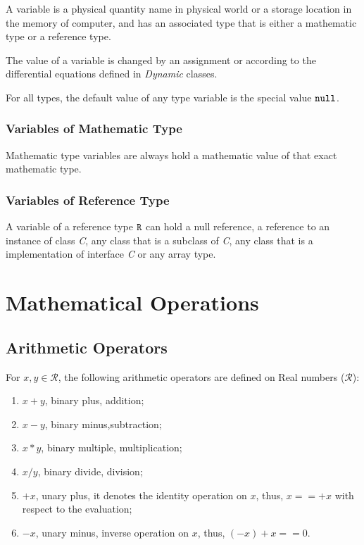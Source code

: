 \documentclass{WileySix}
\begin{document}
A variable is a physical quantity name in physical world or a storage location in the memory of computer, and has an associated type that is either a mathematic type or a reference type.

The value of a variable  is changed by an assignment or according to the differential equations defined in {\em Dynamic} classes.

For all types, the default value of any type variable is the special value ${\tt null}$.

\subsubsection{Variables of Mathematic Type}
Mathematic type variables are always hold a mathematic value of that exact mathematic type.


\subsubsection{Variables of Reference Type}
A variable of a reference type ${\tt R}$ can hold a null reference, a reference to an instance of class {\em C}, any class that is a subclass of {\em C}, any class that is a implementation of interface {\em C} or any array type.



\section{Mathematical Operations}

\subsection{Arithmetic Operators}
For $x,y \in \mathcal{R}$, the following arithmetic operators are defined on Real numbers ($\mathcal{R}$):

\begin{enumerate}
\item  $x + y$,  binary plus, addition;
\item  $x - y$,  binary minus,subtraction;
\item  $x * y$,  binary multiple, multiplication;
\item  $x / y$,  binary divide, division;
\item  $+x$, unary plus, it denotes the identity operation on $x$, thus, $x == +x$ with
 respect to the evaluation;
\item  $-x$,  unary minus, inverse operation on $x$, thus, $(-x) + x == 0$.
\end{enumerate}
\end{document}
